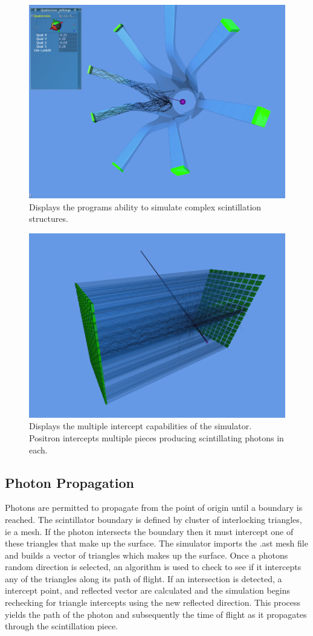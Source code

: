 \documentclass[paper=a4, fontsize=11pt]{scrartcl}
\numberwithin{equation}{section}		%
\numberwithin{figure}{section}			%
\numberwithin{table}{section}				%
\begin{document}
\begin{figure}[h!]
\centering
\includegraphics[width=0.70\linewidth]{posi3.png}
\caption{Displays the programs ability to simulate complex scintillation structures.}
\label{simpic}
\end{figure}

\begin{figure}[h!]
\centering
\includegraphics[width=0.70\linewidth]{multscint.png}
\caption{Displays the multiple intercept capabilities of the simulator. Positron intercepts multiple pieces producing scintillating photons in each.}
\label{multscint}
\end{figure}

\subsection{Photon Propagation}
Photons are permitted to propagate from the point of origin until a boundary is reached. The scintillator boundary is defined by cluster of interlocking triangles, ie a mesh. If the photon intersects the boundary then it must intercept one of these triangles that make up the surface. The simulator imports the .ast mesh file and builds a vector of triangles which makes up the surface. Once a photons random direction is selected, an algorithm is used to check to see if it intercepts any of the triangles along its path of flight. If an intersection is detected, a intercept point, and reflected vector are calculated and the simulation begins rechecking for triangle intercepts using the new reflected direction. This process yields the path of the photon and subsequently the time of flight as it propagates through the scintillation piece. 
\end{document}
